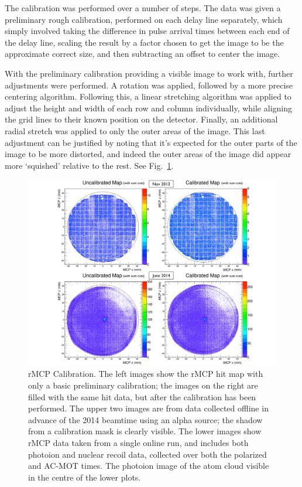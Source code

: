 The calibration was performed over a number of steps.  The data was given a preliminary rough calibration, performed on each delay line separately, which simply involved taking the difference in pulse arrival times between each end of the delay line, scaling the result by a factor chosen to get the image to be the approximate correct size, and then subtracting an offset to center the image.  

With the preliminary calibration providing a visible image to work with, further adjustments were performed.  A rotation was applied, followed by a more precise centering algorithm. Following this, a linear stretching algorithm was applied to adjust the height and width of each row and column individually, while aligning the grid lines to their known position on the detector.  Finally, an additional radial stretch was applied to only the outer areas of the image.  This last adjustment can be justified by noting that it's expected for the outer parts of the image to be more distorted, and indeed the outer areas of the image did appear more `squished' relative to the rest.  See Fig.~\ref{fig:rmcp_calibration}.  
\begin{figure}[h!tb]
	\centering
	\includegraphics[width=.999\linewidth]
	{Figures/rMCP_Calibration}
	\caption[rMCP Calibration]{rMCP Calibration.  The left images show the rMCP hit map with only a basic preliminary calibration; the images on the right are filled with the same hit data, but after the calibration has been performed.  The upper two images are from data collected offline in advance of the 2014 beamtime using an alpha source; the shadow from a calibration mask is clearly visible.  The lower images show rMCP data taken from a single online run, and includes both photoion and nuclear recoil data, collected over both the polarized and AC-MOT times.  The photoion image of the atom cloud visible in the centre of the lower plots.}
	\label{fig:rmcp_calibration}
\end{figure}

